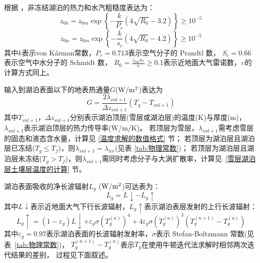 根据 \citet{Zilitinkevich2001}，非冻结湖泊的热力和水汽粗糙度表达为：
\begin{equation}
z_{0 h}=z_{0 m} \exp \left\{-\frac{k}{P_{r}}\left(4 \sqrt{R_{0}}-3.2\right)\right\} \geq 10^{-5}
\end{equation}
\begin{equation}
z_{0 w}=z_{0 m} \exp \left\{-\frac{k}{s_{c}}\left(4 \sqrt{R_{0}}-4.2\right)\right\} \geq 10^{-5}
\end{equation}
其中$k$表示von K\'arman常数，$P_r=0.713$表示空气分子的 Prandtl 数，
$S_c=0.66$表示空气中水分子的 Schmidt 数，
$R_0=\frac{z_{0m}u_\ast}{\upsilon}\geq0.1$表示近地面大气雷诺数，$\upsilon$的计算方式同上。


输入到湖泊表面以下的地表热通量$G$($\rm W/m^2$)表达为
\begin{equation}
G=\frac{2 \lambda_{snl+1}}{\Delta z_{snl+1}}\left(T_{g}-T_{snl+1}\right)
\end{equation}
其中$T_{snl+1}$，$\Delta z_{snl+1}$分别表示湖泊顶层(雪层或湖泊层)的温度(K)与厚度(m)，
$\lambda_{snl+1}$表示湖泊顶层的热力传导率(W/m/K)。
若顶层为雪层，$\lambda_{snl+1}$需考虑雪层的固态和液态含水量，计算见 \ref{温度求解的数值格式} 节；
若顶层为湖泊层且湖泊层已冻结($T_g\le T_f$)，则$\lambda_{snl+1}=\lambda_{ice}$(见表 \ref{tab:物理常数})；
若顶层为湖泊层且湖泊层未冻结($T_g>T_f$)，则$\lambda_{snl+1}$需同时考虑分子与大涡扩散率，计算见~\ref{雪层湖泊层土壤层温度的计算} 节。


湖泊表面吸收的净长波辐射$L_g$ ($\rm W/m^2$)可达表为：
\begin{equation}
L_{g}=L \downarrow-L_{g} \uparrow
\end{equation}
其中$L\downarrow$表示近地面大气下行长波辐射，$L_g\uparrow$表示湖泊表层发射的上行长波辐射：
\begin{equation}
L_{g} \uparrow=\left(1-\varepsilon_{g}\right) L \downarrow+\varepsilon_{g} 
\sigma\left(T_{g}^{(n)}\right)^{4}+4 \varepsilon_{g} 
\sigma\left(T_{g}^{(n)}\right)^{3}\left(T_{g}^{(n+1)}-T_{g}^{(n)}\right)
\end{equation}
其中$\varepsilon_g=0.97$表示湖泊表面的长波辐射发射率，$\sigma$表示 Stefan-Boltzmann 常数(见表~\ref{tab:物理常数})，
$T_g^{\left(n+1\right)}-T_g^{\left(n\right)}$表示$T_g$在使用牛顿迭代法求解时相邻两次迭代结果的差别，
过程见下面叙述。


